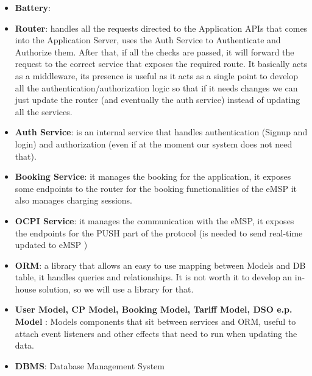 \begin{itemize}
	\item \textbf{Battery}:
	\item \textbf{Router}: handles all the requests directed to the Application APIs that comes into the Application Server, uses the Auth Service to Authenticate and Authorize them. After that, if all the checks are passed, it will forward the request to the correct service that exposes the required route. It basically acts as a middleware, its presence is useful as it acts as a single point to develop all the authentication/authorization logic so that if it needs changes we can just update the router (and eventually the auth service) instead of updating all the services.
	\item \textbf{Auth Service}: is an internal service that handles authentication (Signup and login) and authorization (even if at the moment our system does not need that).
	\item \textbf{Booking Service}: it manages the booking for the application, it exposes some endpoints to the router for the booking functionalities of the eMSP it also manages charging sessions.
	\item \textbf{OCPI Service}: it manages the communication with the eMSP, it exposes the endpoints for the PUSH part of the protocol (is needed to send real-time updated to eMSP )
	\item \textbf{ORM}: a library that allows an easy to use mapping between Models and DB table, it handles queries and relationships. It is not worth it to develop an in-house solution, so we will use a library for that.
	\item \textbf{User Model, CP Model, Booking Model, Tariff Model, DSO e.p. Model }: Models components that sit between services and ORM, useful to attach event listeners and other effects that need to run when updating the data. 
	\item \textbf{DBMS}: Database Management System
\end{itemize}




















